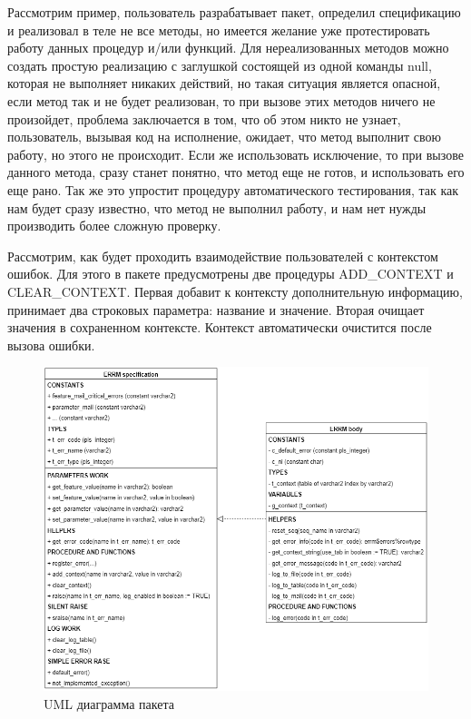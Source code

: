 Рассмотрим пример, пользователь разрабатывает пакет, определил спецификацию и реализовал в теле не все методы, но имеется желание уже протестировать работу данных процедур и/или функций. Для нереализованных методов можно создать простую реализацию с заглушкой состоящей из одной команды null, которая не выполняет никаких действий, но такая ситуация является опасной, если метод так и не будет реализован, то при вызове этих методов ничего не произойдет, проблема заключается в том, что об этом никто не узнает, пользователь, вызывая код на исполнение, ожидает, что метод выполнит свою работу, но этого не происходит. Если же использовать исключение, то при вызове данного метода, сразу станет понятно, что метод еще не готов, и использовать его еще рано. Так же это упростит процедуру автоматического тестирования, так как нам будет сразу известно, что метод не выполнил работу, и нам нет нужды производить более сложную проверку. 

Рассмотрим, как будет проходить взаимодействие пользователей с контекстом ошибок. Для этого в пакете предусмотрены две процедуры ADD\_CONTEXT и CLEAR\_CONTEXT. Первая добавит к контексту дополнительную информацию, принимает два строковых параметра: название и значение. Вторая очищает значения в сохраненном контексте. Контекст автоматически очистится после вызова ошибки.

\begin{figure}[ht!] 
	\center
	\includegraphics [scale=0.6] {my_folder/img/C3_UML_diagram.png}
	\caption{UML диаграмма пакета} 
	\label{fig:C3_UML_diagram}  
\end{figure}
\FloatBarrier

